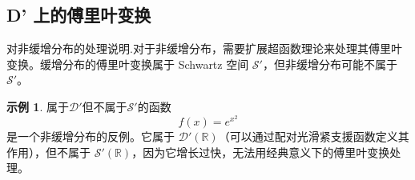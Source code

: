 \documentclass[12pt,a4paper]{article}
\theoremstyle{plain}
\theoremstyle{definition}
\newtheorem{example}[theorem]{示例}
\theoremstyle{remark}
\begin{document}
\subsection{D' 上的傅里叶变换}

对非缓增分布的处理说明.对于非缓增分布，需要扩展超函数理论来处理其傅里叶变换。缓增分布的傅里叶变换属于 Schwartz 空间 \( \mathcal{S}' \)，但非缓增分布可能不属于 \( \mathcal{S}' \)。

\begin{example}属于$\mathcal{D}'$但不属于$\mathcal{S}'$的函数
		\[ 
		f(x) = e^{x^2} 
		\] 
		是一个非缓增分布的反例。它属于 \( \mathcal{D}'(\mathbb{R}) \)（可以通过配对光滑紧支援函数定义其作用），但不属于 \( \mathcal{S}'(\mathbb{R}) \)，因为它增长过快，无法用经典意义下的傅里叶变换处理。
\end{example}
\end{document}
